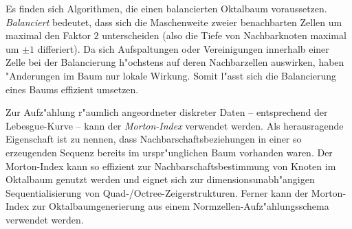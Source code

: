 Es finden sich Algorithmen, die einen balancierten Oktalbaum voraussetzen. 
\emph{Balanciert} bedeutet, dass sich die Maschenweite zweier benachbarten 
Zellen um maximal den Faktor $2$ unterscheiden (also die Tiefe von 
Nachbarknoten maximal um $\pm 1$ differiert). 
Da sich Aufspaltungen oder Vereinigungen 
innerhalb einer Zelle bei der Balancierung h"ochstens auf deren 
Nachbarzellen auswirken, haben "Anderungen im Baum nur lokale Wirkung. 
Somit l"asst sich die Balancierung eines Baums effizient umsetzen.

Zur Aufz"ahlung r"aumlich angeordneter diskreter Daten -- entsprechend 
der Lebesgue-Kurve -- kann der \emph{Morton-Index} verwendet werden. 
Als herausragende Eigenschaft ist zu nennen, dass Nachbarschaftsbeziehungen 
in einer so erzeugenden Sequenz bereits im urspr"unglichen Baum vorhanden
waren. 
Der Morton-Index kann so effizient zur Nachbarschaftsbestimmung von Knoten 
im Oktalbaum genutzt werden und eignet sich zur dimensionsunabh"angigen 
Sequentialisierung von Quad-/Octree-Zeigerstrukturen. 
Ferner kann der Morton-Index zur 
Oktalbaumgenerierung aus einem 
Normzellen-Aufz"ahlungsschema verwendet werden.


